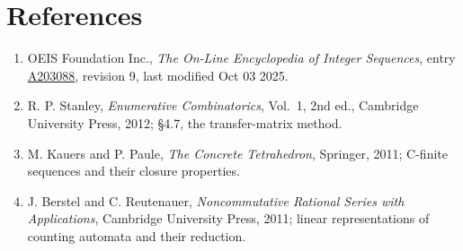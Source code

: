 \documentclass[11pt]{article}
\theoremstyle{definition}
\begin{document}
\section{References}

\begin{enumerate}

\item OEIS Foundation Inc., \emph{The On-Line Encyclopedia of Integer Sequences}, entry \href{https://oeis.org/A203088}{A203088}, revision 9, last modified Oct 03 2025.

\item R. P. Stanley, \emph{Enumerative Combinatorics}, Vol.~1, 2nd ed., Cambridge University Press, 2012; \S4.7, the transfer-matrix method.

\item M. Kauers and P. Paule, \emph{The Concrete Tetrahedron}, Springer, 2011; C-finite sequences and their closure properties.

\item J. Berstel and C. Reutenauer, \emph{Noncommutative Rational Series with Applications}, Cambridge University Press, 2011; linear representations of counting automata and their reduction.

\end{enumerate}
\end{document}
